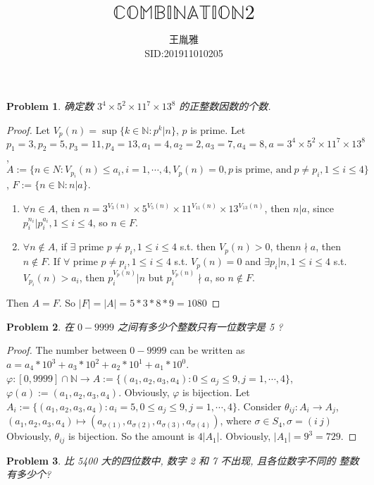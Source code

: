 \documentclass{ctexart}
\title{$\mathbb{COMBINATION}\text{2}$}
\author{王胤雅\\
SID:201911010205\\
\email{201911010205@mail.bnu.edu.cn}}
\newtheorem{problem}{\textbf{Problem}}
\newcommand\N{\mathbb {N}}
\renewcommand\phi{\varphi}
\renewcommand{\(}{\left(}
\renewcommand{\)}{\right)}
\begin{document}
\maketitle

\begin{problem}
确定数 $3^4 \times 5^2 \times 11^7 \times 13^8$ 的正整数因数的个数.
\end{problem}
\begin{proof}
Let $V_p(n)=\sup\{k\in\N: p^k|n\}$, $p$ is prime.
Let $p_1=3,p_2=5,p_3=11,p_4=13, a_1=4,a_2=2,a_3=7,a_4=8, a=3^4 \times 5^2 \times 11^7 \times 13^8$, $A:=\{n\in N: V_{p_i}(n)\leq a_i, i=1,\cdots ,4, V_p(n)=0, p \ \text{is prime, and}\  p\neq p_i, 1\leq i\leq 4 \}$, $F:=\{n\in \N : n|a\}$.
\iffalse$\psi : A\to F$, $n\mapsto 3^{V_3(n)} \times 5^{V_5(n)} \times 11^{V_{11}(n)}\times 13^{V_{13}(n)}$. \fi
\begin{enumerate}
\item $\forall n\in A$, then $n= 3^{V_3(n)} \times 5^{V_5(n)} \times 11^{V_{11}(n)}\times 13^{V_{13}(n)}$,  then $n|a$, since $p_i^{n_i}|p_i^{a_i}, 1\leq i\leq 4$, so $n\in F$.
\item $\forall n\notin A$, if $\exists $ prime $p\neq p_i,1\leq i\leq 4$ s.t. then $V_p(n) > 0$, then$n\nmid a$, then $n\notin F$. If $\forall $ prime $p\neq p_i,1\leq i\leq 4$ s.t. $V_p(n)=0$ and $\exists p_i | n, 1\leq i\leq 4 $ s.t. $V_{p_i}(n)>a_i$, then $p_i^{V_p(n)}|n$ but $p_i^{V_p(n)}\nmid a$, so $n\notin F$.
\end{enumerate}
Then $A=F$. So $|F|=|A|=5*3*8*9=1080$
\end{proof}
\begin{problem}
在 $0-9999$ 之间有多少个整数只有一位数字是 5 ?
\end{problem}
\begin{proof}
The number between $0-9999$ can be written as $a = a_4*10^3+a_3*10^2+a_2*10^1+a_1*10^0$. $\phi: [0,9999]\cap \N\to A:=\{(a_1,a_2,a_3,a_4):0\leq a_j\leq 9, j=1,\cdots, 4\}$,  $\phi(a):=(a_1,a_2,a_3,a_4)$. Obviously, $\phi$ is bijection. Let $A_i:=\{(a_1,a_2,a_3,a_4):a_i=5,0\leq a_j\leq 9, j=1,\cdots, 4\}$. Consider $\theta_{ij}: A_i\to A_j$, $(a_1,a_2,a_3,a_4)\mapsto(a_{\sigma(1)},a_{\sigma(2)},a_{\sigma(3)},a_{\sigma(4)})$, where $\sigma\in S_4, \sigma=(i\ j)$
Obviously, $\theta_{ij}$ is bijection. So the amount is $4|A_1|$. Obviously, $|A_1|=9^3=729$.
\end{proof}
\begin{problem}
比 5400 大的四位数中, 数字 2 和 7 不出现, 且各位数字不同的 整数有多少个?
\end{problem}
\end{document}
